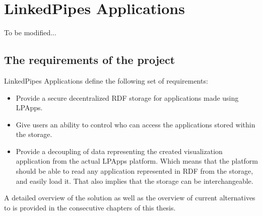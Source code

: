 \chapter{LinkedPipes Applications}
\label{chap:num_1}

To be modified...

\section{The requirements of the project}

LinkedPipes Applications define the following set of requirements: 

\begin{itemize}
	\item Provide a secure decentralized RDF storage for applications made using LPApps.
    \item Give users an ability to control who can access the applications stored within the storage.
    \item Provide a decoupling of data representing the created visualization application from the actual LPApps platform. Which means that the platform should be able to read any application represented in RDF from the storage, and easily load it. That also implies that the storage can be interchangeable. 
\end{itemize}

A detailed overview of the solution as well as the overview of current alternatives to \solid is provided in the consecutive chapters of this thesis. 
